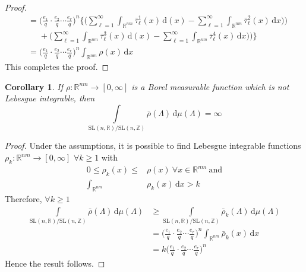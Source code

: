 \documentclass[11pt]{article}
\newtheorem{corollary}[theorem]{Corollary}
\theoremstyle{definition}
\theoremstyle{proof}
\begin{document}
\begin{proof}
\begin{align*}
        &= {\bigg(\frac{e_1}{q} \cdot \frac{e_2}{q} \cdots \frac{e_r}{q} \bigg)}^n \Bigg\{\Bigg(\sum_{\ell=1}^{\infty} \int_{\mathbb{R}^{nm}}{\bar{\tau }}_{\ell}^{1}(x) \, \mathrm{d} (x) - \sum_{\ell=1}^{\infty}\int_{\mathbb{R}^{nm}} {\bar{\tau }}_{\ell}^{2} (x) \, \mathrm{d} x) \Bigg) \\
        & \ \ \ \ \ \ + \Bigg(\sum_{\ell=1}^{\infty} \int_{\mathbb{R}^{nm}}{\bar{\tau }}_{\ell}^{3}(x) \, \mathrm{d} (x) - \sum_{\ell=1}^{\infty}\int_{\mathbb{R}^{nm}} {\bar{\tau }}_{\ell}^{4} (x) \, \mathrm{d} x) \Bigg) \Bigg\} \\
        &= {\bigg(\frac{e_1}{q} \cdot \frac{e_2}{q} \cdots \frac{e_r}{q} \bigg)}^n \int_{\mathbb{R}^{nm}} \rho (x) \, \mathrm{d} x
    \end{align*}
    This completes the proof.
\end{proof}

\begin{corollary}\label{cori}
    If $ \rho : \mathbb{R}^{nm} \to [0, \infty]$ is a Borel measurable function which is not Lebesgue integrable, then
    \[
        \int\limits_{\mathrm{SL}(n,\mathbb{R})/\mathrm{SL}(n,\mathbb{Z})}  \bar{\rho }(\Lambda ) \, \mathrm{d} \mu (\Lambda ) = \infty
    \]
\end{corollary}
\begin{proof}
    Under the assumptions, it is possible to find Lebesgue integrable functions $\rho _k: \mathbb{R}^{nm} \to [0, \infty]$ $\forall k \geq 1$ with
    \begin{align*}
        0 \leq \rho _k(x) \leq &\rho (x) \ \forall x \in \mathbb{R}^{nm} \ \text{and}\\
        \int_{\mathbb{R}^{nm}} &\rho _k(x) \, \mathrm{d} x > k
    \end{align*}
    Therefore, $\forall k \geq 1$
    \begin{align*}
        \int\limits_{\mathrm{SL}(n,\mathbb{R})/\mathrm{SL}(n,\mathbb{Z})} \bar{\rho }(\Lambda ) \, \mathrm{d} \mu (\Lambda ) &\geq \int\limits_{\mathrm{SL}(n,\mathbb{R})/\mathrm{SL}(n,\mathbb{Z})} \bar{\rho }_k (\Lambda ) \, \mathrm{d} \mu (\Lambda ) \\
        &= {\bigg(\frac{e_1}{q} \cdot \frac{e_2}{q} \cdots \frac{e_r}{q} \bigg)}^n \int_{\mathbb{R}^{nm}} \bar{\rho }_k(x) \, \mathrm{d} x \\
        &= k{\bigg(\frac{e_1}{q} \cdot \frac{e_2}{q} \cdots \frac{e_r}{q} \bigg)}^n
    \end{align*}
    Hence the result follows.
\end{proof}
\end{document}
